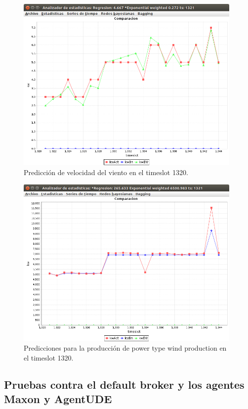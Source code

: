 \begin{figure}[h]
	\centering
	\includegraphics[width=11cm]{img/prediccionViento1320.png}
	\caption{Predicción de velocidad del viento en el timeslot 1320.}
	\label{fig:prediccionViento1320}
\end{figure}

\begin{figure}[h]
	\centering
	\includegraphics[width=11cm]{img/produccionViento1320.png}
	\caption{Predicciones para la producción de power type wind production en el timeslot 1320.}
	\label{fig:produccionViento1320}
\end{figure}
\clearpage
\subsection{Pruebas contra el default broker y los agentes Maxon y AgentUDE} \label{subsection:pruebasDefaultBrokerMaxonYUDE}

